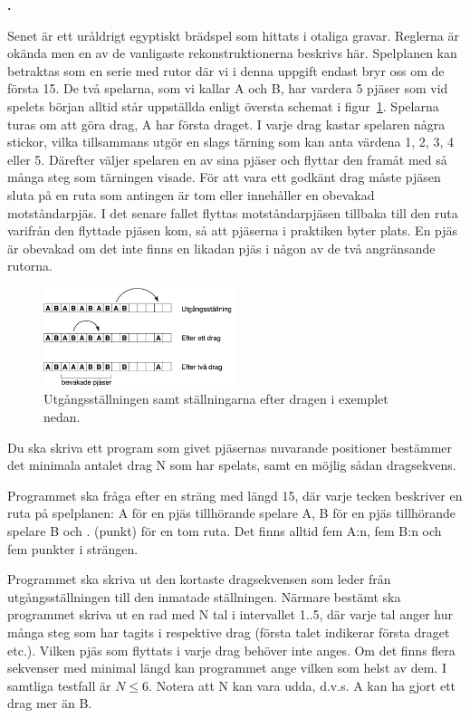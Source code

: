\documentclass[a4paper,12pt]{article}
\newcounter{iii}\setcounter{iii}{0}
\def\i{\bigskip\noindent\refstepcounter{iii}\textbf{\arabic{iii}.} }
\newcounter{pun}[iii]
\begin{document}
\i

Senet är ett uråldrigt egyptiskt brädspel som hittats i otaliga gravar. Reglerna är okända men en av de vanligaste rekonstruktionerna beskrivs här. Spelplanen kan betraktas som en serie med rutor där vi i denna uppgift endast bryr oss om de första 15. De två spelarna, som vi kallar A och B, har vardera 5 pjäser som vid spelets början alltid står uppställda enligt översta schemat i figur~\ref{fig:senet}. Spelarna turas om att göra drag, A har första draget. I varje drag kastar spelaren några stickor, vilka tillsammans utgör en slags tärning som kan anta värdena 1, 2, 3, 4 eller 5. Därefter väljer spelaren en av sina pjäser och flyttar den framåt med så många steg som tärningen visade. För att vara ett godkänt drag måste pjäsen sluta på en ruta som antingen är tom eller innehåller en obevakad motståndarpjäs. I det senare fallet flyttas motståndarpjäsen tillbaka till den ruta varifrån den flyttade pjäsen kom, så att pjäserna i praktiken byter plats. En pjäs är obevakad om det inte finns en likadan pjäs i någon av de två angränsande rutorna.


\begin{figure}[!ht]
\centering
\includegraphics[width=0.5\textwidth]{Senet.png}
\caption{Utgångsställningen samt ställningarna efter dragen i exemplet nedan.}
\label{fig:senet}
\end{figure}

Du ska skriva ett program som givet pjäsernas nuvarande positioner bestämmer det minimala antalet drag N som har spelats, samt en möjlig sådan dragsekvens.

Programmet ska fråga efter en sträng med längd 15, där varje tecken beskriver en ruta på spelplanen: A för en pjäs tillhörande spelare A, B för en pjäs tillhörande spelare B och . (punkt) för en tom ruta. Det finns alltid fem A:n, fem B:n och fem punkter i strängen.

Programmet ska skriva ut den kortaste dragsekvensen som leder från utgångsställningen till den inmatade ställningen. Närmare bestämt ska programmet skriva ut en rad med N tal i intervallet 1..5, där varje tal anger hur många steg som har tagits i respektive drag (första talet indikerar första draget etc.). Vilken pjäs som flyttats i varje drag behöver inte anges. Om det finns flera sekvenser med minimal längd kan programmet ange vilken som helst av dem. I samtliga testfall är $N \le 6$. Notera att N kan vara udda, d.v.s. A kan ha gjort ett drag mer än B.
\end{document}
